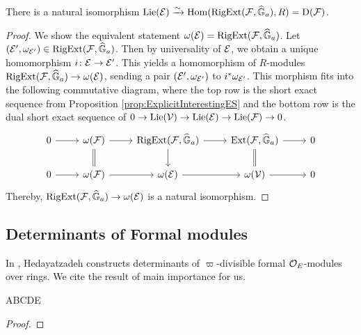 \documentclass[../main.tex]{subfiles}
\begin{document}
\begin{lem}\label{lem:LieAlgOfUnivAddExt}
  There is a natural isomorphism $\operatorname{Lie}(\mathcal{E}) \xrightarrow{\sim} \operatorname{Hom}(\operatorname {RigExt}(\mathcal{F}, \widehat{\mathbb{G}}_a), R) 
  = \mathrm{D}(\mathcal{F})$.
\begin{proof}
  We show the equivalent statement $\omega(\mathcal{E}) = \operatorname {RigExt}(\mathcal{F}, \widehat{\mathbb{G}}_a)$. 
  Let $(\mathcal{E}', \omega_{\mathcal{E}'}) \in \operatorname {RigExt}(\mathcal{F}, \widehat{\mathbb{G}}_a)$. Then by universality of 
  $\mathcal{E}$, we obtain a unique homomorphism $i\colon  \mathcal{E} \to \mathcal{E}'$. This yields a 
  homomorphism of $R$-modules $\operatorname {RigExt}(\mathcal{F}, \widehat{\mathbb{G}}_a) \to \omega(\mathcal{E})$, 
  sending a pair $(\mathcal{E}', \omega_{\mathcal{E}'})$ to $i^*\omega_{\mathcal{E}'}$. This morphism
  fits into the following commutative diagram, where the top row is 
  the short exact sequence from Proposition \ref{prop:ExplicitInterestingES}
  and the bottom row is the dual short exact sequence of 
  $0 \to \operatorname{Lie}(\mathcal{V}) \to \operatorname{Lie}(\mathcal{E}) \to \operatorname{Lie}(\mathcal{F}) \to 0$.
  \begin{equation*}
  \begin{tikzcd}[ampersand replacement=\&]
  	0 \& {\omega(\cF)} \& {\RigExt(\cF, \Ghat_a)} \& {\Ext(\cF, \Ghat_a)} \& 0 \\
  	0 \& {\omega(\cF)} \& {\omega(\cE)} \& {\omega(\cV)} \& 0
  	\arrow[from=1-1, to=1-2]
  	\arrow[from=1-2, to=1-3]
  	\arrow[Rightarrow, no head, from=1-2, to=2-2]
  	\arrow[from=1-3, to=1-4]
  	\arrow[from=1-3, to=2-3]
  	\arrow[from=1-4, to=1-5]
  	\arrow[Rightarrow, no head, from=1-4, to=2-4]
  	\arrow[from=2-1, to=2-2]
  	\arrow[from=2-2, to=2-3]
  	\arrow[from=2-3, to=2-4]
  	\arrow[from=2-4, to=2-5]
  \end{tikzcd}
  \end{equation*}
  Thereby, $\operatorname {RigExt}(\mathcal{F}, \widehat{\mathbb{G}}_a) \to \omega(\mathcal{E})$ is a natural isomorphism.
\end{proof}
\end{lem}
\subsection{Determinants of Formal modules} %
\label{sub:Determinants of Formal modules}
In \cite{hedayatzadeh2015det}, Hedayatzadeh constructs determinants of 
$\varpi$-divisible formal $\mathcal{O}_E$-modules over  rings. 
We cite the result of main importance for us.
\begin{thm}\label{thm:HedayatzadehsResult}
  ABCDE
\begin{proof}
\end{proof}
\end{thm}
\end{document}

